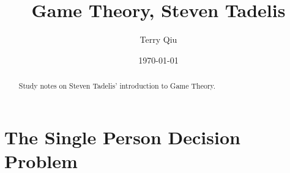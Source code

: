 \documentclass{tufte-handout}
\title{Game Theory, Steven Tadelis}
\author[Terry Qiu]{Terry Qiu}
\date{\today}  %
\theoremstyle{definition}
\theoremstyle{remark}
\begin{document}
\maketitle
\begin{abstract}
Study notes on Steven Tadelis' introduction to Game Theory.
\end{abstract}
\tableofcontents
\section{The Single Person Decision Problem}
\end{document}
